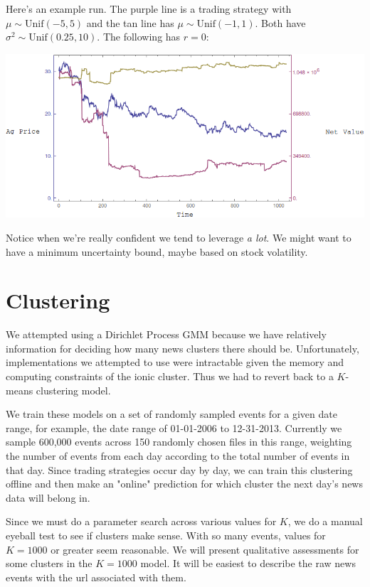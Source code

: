 \documentclass{article}
\begin{document}
Here's an example run. The purple line is a trading strategy with $\mu\sim\text{Unif}(-5,5)$ and the tan line has $\mu\sim\text{Unif}(-1,1)$. Both have $\sigma^2\sim\text{Unif}(0.25,10)$. The following has $r=0$:

\begin{center}
\includegraphics[scale=0.5]{../KellyRun-Random.png}
\end{center}

Notice when we're really confident we tend to leverage {\em a lot}. We might want to have a minimum uncertainty bound, maybe based on stock volatility.

		\section{Clustering}
	
	We attempted using a Dirichlet Process GMM because we have relatively information for deciding how many news clusters there should be. Unfortunately, implementations we attempted to use were intractable given the memory and computing constraints of the ionic cluster. Thus we had to revert back to a $K$-means clustering model.

	We train these models on a set of randomly sampled events for a given date range, for example, the date range of 01-01-2006 to 12-31-2013. Currently we sample 600,000 events across 150 randomly chosen files in this range, weighting the number of events from each day according to the total number of events in that day. Since trading strategies occur day by day, we can train this clustering offline and then make an "online" prediction for which cluster the next day's news data will belong in.

	Since we must do a parameter search across various values for $K$, we do a manual eyeball test to see if clusters make sense. With so many events, values for $K=1000$ or greater seem reasonable. We will present qualitative assessments for some clusters in the $K=1000$ model. It will be easiest to describe the raw news events with the url associated with them.
\end{document}
